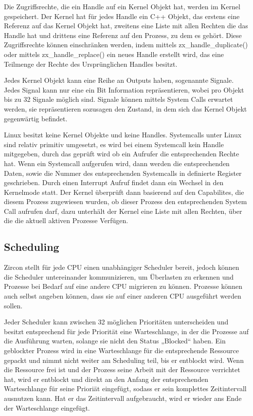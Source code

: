 \documentclass[a4paper]{scrartcl}
\begin{document}
Die Zugriffsrechte, die ein Handle auf ein Kernel Objekt hat, werden im Kernel gespeichert. Der Kernel hat für jedes Handle ein C++ Objekt, das erstens eine Referenz auf das Kernel Objekt hat, zweitens eine Liste mit allen Rechten die das Handle hat und drittens eine Referenz auf den Prozess, zu dem es gehört. Diese Zugriffsrechte können einschränken werden, indem mittels zx\_handle\_duplicate() \cite{Fuchsia.HandleDuplicate} oder mittels zx\_handle\_replace() \cite{Fuchsia.HandleReplace} ein neues Handle erstellt wird, das eine Teilmenge der Rechte des Ursprünglichen Handles besitzt.\cite{Fuchsia.Zircon.Handles}

Jedes Kernel Objekt kann eine Reihe an Outputs haben, sogenannte Signale. Jedes Signal kann nur eine ein Bit Information repräsentieren, wobei pro Objekt bis zu 32 Signale möglich sind. Signale können mittels System Calls erwartet werden, sie repräsentieren sozusagen den Zustand, in dem sich das Kernel Objekt gegenwärtig befindet.\cite{Fuchsia.Zircon.Signals}

Linux besitzt keine Kernel Objekte und keine Handles. Systemcalls unter Linux sind relativ primitiv umgesetzt, es wird bei einem Systemcall kein Handle mitgegeben, durch das geprüft wird ob ein Aufrufer die entsprechenden Rechte hat. Wenn ein Systemcall aufgerufen wird, dann werden die entsprechenden Daten, sowie die Nummer des entsprechenden Systemcalls in definierte Register geschrieben. Durch einen Interrupt Aufruf findet dann ein Wechsel in den Kernelmode statt. Der Kernel überprüft dann basierend auf den Capabilites, die diesem Prozess zugewiesen wurden, ob dieser Prozess den entsprechenden System Call aufrufen darf, dazu unterhält der Kernel eine Liste mit allen Rechten, über die die aktuell aktiven Prozesse Verfügen.\cite{Android.Kernel.Capabilities}
\subsection{Scheduling}
Zircon stellt für jede CPU einen unabhängiger Scheduler bereit, jedoch können die Scheduler untereinander kommunizieren, um Überlasten zu erkennen und Prozesse bei Bedarf auf eine andere CPU migrieren zu können. Prozesse können auch selbst angeben können, dass sie auf einer anderen CPU ausgeführt werden sollen.

Jeder Scheduler kann zwischen 32 möglichen Prioritäten unterscheiden und besitzt entsprechend für jede Priorität eine Warteschlange, in der die Prozesse auf die Ausführung warten, solange sie nicht den Status „Blocked“ haben. Ein geblockter Prozess wird in eine Warteschlange für die entsprechende Ressource gepackt und nimmt nicht weiter am Scheduling teil, bis er entblockt wird. Wenn die Ressource frei ist und der Prozess seine Arbeit mit der Ressource verrichtet hat, wird er entblockt und direkt an den Anfang der entsprechenden Warteschlange für seine Prioriät eingefügt, sodass er sein komplettes Zeitintervall ausnutzen kann. Hat er das Zeitintervall aufgebraucht, wird er wieder ans Ende der Warteschlange eingefügt.\cite{Fuchsia.Zircon.Scheduling}
\end{document}
